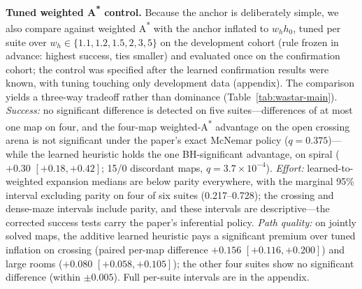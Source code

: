 \documentclass[letterpaper]{article} %
\begin{document}
\textbf{Tuned weighted A\textsuperscript{*} control.} Because the anchor is deliberately simple, we also compare against weighted A\textsuperscript{*} with the anchor inflated to $w_h h_0$, tuned per suite over $w_h \in \{1.1, 1.2, 1.5, 2, 3, 5\}$ on the development cohort (rule frozen in advance: highest success, ties smaller) and evaluated once on the confirmation cohort; the control was specified after the learned confirmation results were known, with tuning touching only development data (appendix). The comparison yields a three-way tradeoff rather than dominance (Table~\ref{tab:wastar-main}). \emph{Success:} no significant difference is detected on five suites---differences of at most one map on four, and the four-map weighted-A\textsuperscript{*} advantage on the open crossing arena is not significant under the paper's exact McNemar policy ($q{=}0.375$)---while the learned heuristic holds the one BH-significant advantage, on spiral ($+0.30$ $[+0.18,+0.42]$; 15/0 discordant maps, $q{=}3.7\times10^{-4}$). \emph{Effort:} learned-to-weighted expansion medians are below parity everywhere, with the marginal 95\% interval excluding parity on four of six suites (0.217--0.728); the crossing and dense-maze intervals include parity, and these intervals are descriptive---the corrected success tests carry the paper's inferential policy. \emph{Path quality:} on jointly solved maps, the additive learned heuristic pays a significant premium over tuned inflation on crossing (paired per-map difference $+0.156$ $[+0.116,+0.200]$) and large rooms ($+0.080$ $[+0.058,+0.105]$); the other four suites show no significant difference (within $\pm 0.005$). Full per-suite intervals are in the appendix.
\end{document}

